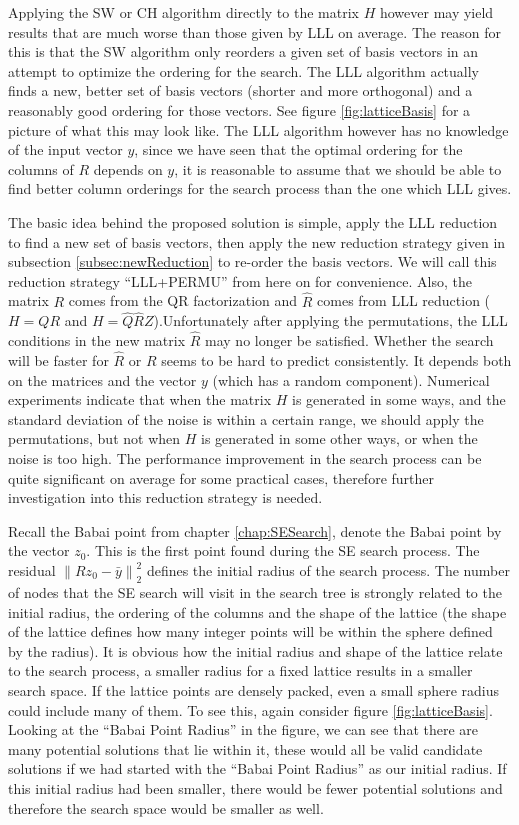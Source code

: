 \documentclass[12pt,Bold,letterpaper]{mcgilletdclass}
\begin{document}
Applying the SW or CH algorithm directly to the matrix $H$ however may yield results that are much worse than those given by LLL on average. The reason for this is that the SW algorithm only reorders a given set of basis vectors in an attempt to optimize the ordering for the search. The LLL algorithm actually finds a new, better set of basis vectors (shorter and more orthogonal) and a reasonably good ordering for those vectors. See figure \ref{fig:latticeBasis} for a picture of what this may look like. The LLL algorithm however has no knowledge of the input vector $y$, since we have seen that the optimal ordering for the columns of $R$ depends on $y$, it is reasonable to assume that we should be able to find better column orderings for the search process than the one which LLL gives.

The basic idea behind the proposed solution is simple, apply the LLL reduction to find a new set of basis vectors, then apply the new reduction strategy given in subsection \ref{subsec:newReduction} to re-order the basis vectors. We will call this reduction strategy ``LLL+PERMU'' from here on for convenience. Also, the matrix $R$ comes from the QR factorization and $\hat{R}$ comes from LLL reduction ($H = QR$ and $H = \hat{Q}\hat{R}Z$).Unfortunately after applying the permutations, the LLL conditions in the new matrix $\hat{R}$ may no longer be satisfied. Whether the search will be faster for $\hat{R}$ or $R$ seems to be hard to predict consistently. It depends both on the matrices and the vector $y$ (which has a random component). Numerical experiments indicate that when the matrix $H$ is generated in some ways, and the standard deviation of the noise is within a certain range, we should apply the permutations, but not when $H$ is generated in some other ways, or when the noise is too high. The performance improvement in the search process can be quite significant on average for some practical cases, therefore further investigation into this reduction strategy is needed.

Recall the Babai point from chapter \ref{chap:SESearch}, denote the Babai point by the vector $z_0$. This is the first point found during the SE search process. The residual $\left \| Rz_0 - \bar{y} \right \|^2_2$ defines the initial radius of the search process. The number of nodes that the SE search will visit in the search tree is strongly related to the initial radius, the ordering of the columns and the shape of the lattice (the shape of the lattice defines how many integer points will be within the sphere defined by the radius). It is obvious how the initial radius and shape of the lattice relate to the search process, a smaller radius for a fixed lattice results in a smaller search space. If the lattice points are densely packed, even a small sphere radius could include many of them. To see this, again consider figure \ref{fig:latticeBasis}. Looking at the ``Babai Point Radius'' in the figure, we can see that there are many potential solutions that lie within it, these would all be valid candidate solutions if we had started with the ``Babai Point Radius'' as our initial radius. If this initial radius had been smaller, there would be fewer potential solutions and therefore the search space would be smaller as well.
\end{document}
